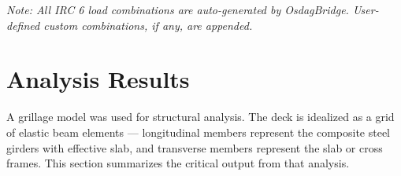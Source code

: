 \documentclass[12pt,a4paper]{report}
\numberwithin{table}{chapter}
\numberwithin{figure}{chapter}
\renewcommand{\arraystretch}{1.18}
\begin{document}
\noindent\textit{Note: All IRC 6 load combinations are auto-generated by OsdagBridge. User-defined custom combinations, if any, are appended.}


\chapter{Analysis Results}

A grillage model was used for structural analysis. The deck is idealized as a grid of elastic beam elements --- longitudinal members represent the composite steel girders with effective slab, and transverse members represent the slab or cross frames. This section summarizes the critical output from that analysis.

\vspace{1em}
\begingroup
\footnotesize
\setlength{\tabcolsep}{4pt}
\renewcommand{\arraystretch}{1.25}
\end{document}
